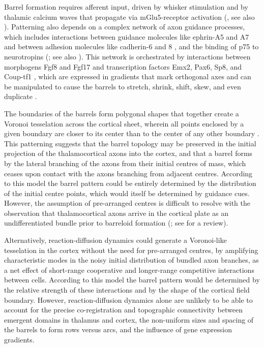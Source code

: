 \documentclass[a4paper,11pt]{article}
\begin{document}
Barrel formation requires afferent input, driven by whisker stimulation and by
thalamic calcium waves that propagate via mGlu5-receptor activation
(\citealp{anton-bolanos_prenatal_2019}, see also \citealp{anton-bolanos_developmental_2018}). Patterning also depends
on a complex network of axon guidance processes, which includes interactions
between guidance molecules like ephrin-A5 and A7 \citep{miller_epha7-ephrin-a5_2006} and
between adhesion molecules like cadherin-6 and 8 \citep{greig_molecular_2013,bishop_regulation_2000},
and the binding of p75 to neurotropins (\citealp{shimogori_fibroblast_2005,bishop_distinct_2002};
see also \citealp{dye_lifespan_2011,dye_lifespan_2011-1}). This network is orchestrated by
interactions between morphogens Fgf8 and Fgf17 and transcription factors Emx2,
Pax6, Sp8, and Coup-tf1 \citep{shimogori_fibroblast_2005,bishop_regulation_2000}, which are expressed
in gradients that mark orthogonal axes and can be manipulated to cause the
barrels to stretch, shrink, shift, skew, and even duplicate
\citep{shimogori_fibroblast_2005,assimacopoulos_fibroblast_2012,borello_sp8_2014,sahara_sp8_2007,ypsilanti_transcriptional_2016,sur_patterning_2005}.

The boundaries of the barrels form polygonal shapes that together
create a Voronoi tesselation across the cortical sheet, wherein all
points enclosed by a given boundary are closer to its center than to
the center of any other boundary \citep{senft_mouse_1991}. This
patterning suggests that the barrel topology may be preserved in the
initial projection of the thalamocortical axons into the cortex, and
that a barrel forms by the lateral branching of the axons from their
initial centres of mass, which ceases upon contact with the axons
branching from adjacent centres. According to this model the barrel
pattern could be entirely determined by the distribution of the
initial centre points, which would itself be determined by guidance
cues. However, the assumption of pre-arranged centres is difficult to
resolve with the observation that thalamocortical axons arrive in the
cortical plate as an undifferentiated bundle prior to barreloid
formation (\citealp{agmon_organized_1993}; see \citealp{erzurumlu_development_2012} for a review).

Alternatively, reaction-diffusion dynamics could generate a Voronoi-like
tesselation in the cortex without the need for pre-arranged centres, by
amplifying characteristic modes in the noisy initial distribution of bundled
axon branches, as a net effect of short-range cooperative and longer-range
competitive interactions between cells. According to this model the barrel
pattern would be determined by the relative strength of these interactions and
by the shape of the cortical field boundary. However, reaction-diffusion
dynamics alone are unlikely to be able to account for the precise
co-registration and topographic connectivity between emergent domains in
thalamus and cortex, the non-uniform sizes and spacing of the barrels to form
rows versus arcs, and the influence of gene expression gradients.
\end{document}
